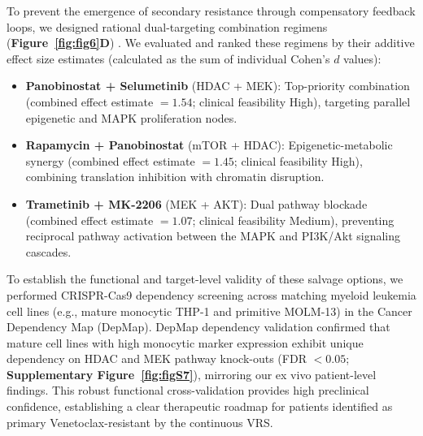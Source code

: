 \documentclass[11pt,a4paper]{article}
\begin{document}
To prevent the emergence of secondary resistance through compensatory feedback loops, we designed rational dual-targeting combination regimens (\textbf{Figure~\ref{fig:fig6}D}) \cite{bliss1939toxicity, greco1995search, foucquier2015analysis, ianevski2017synergyfinder}. We evaluated and ranked these regimens by their additive effect size estimates (calculated as the sum of individual Cohen's $d$ values):
\begin{itemize}
\item \textbf{Panobinostat + Selumetinib} (HDAC + MEK): Top-priority combination (combined effect estimate $= 1.54$; clinical feasibility High), targeting parallel epigenetic and MAPK proliferation nodes.
\item \textbf{Rapamycin + Panobinostat} (mTOR + HDAC): Epigenetic-metabolic synergy (combined effect estimate $= 1.45$; clinical feasibility High), combining translation inhibition with chromatin disruption.
\item \textbf{Trametinib + MK-2206} (MEK + AKT): Dual pathway blockade (combined effect estimate $= 1.07$; clinical feasibility Medium), preventing reciprocal pathway activation between the MAPK and PI3K\slash\allowbreak Akt signaling cascades.
\end{itemize}

To establish the functional and target-level validity of these salvage options, we performed CRISPR-Cas9 dependency screening across matching myeloid leukemia cell lines (e.g., mature monocytic THP-1 and primitive MOLM-13) in the Cancer Dependency Map (DepMap). DepMap dependency validation confirmed that mature cell lines with high monocytic marker expression exhibit unique dependency on HDAC and MEK pathway knock-outs (FDR $< 0.05$; \textbf{Supplementary Figure~\ref{fig:figS7}}), mirroring our ex vivo patient-level findings. This robust functional cross-validation provides high preclinical confidence, establishing a clear therapeutic roadmap for patients identified as primary Venetoclax-resistant by the continuous VRS.
\end{document}
